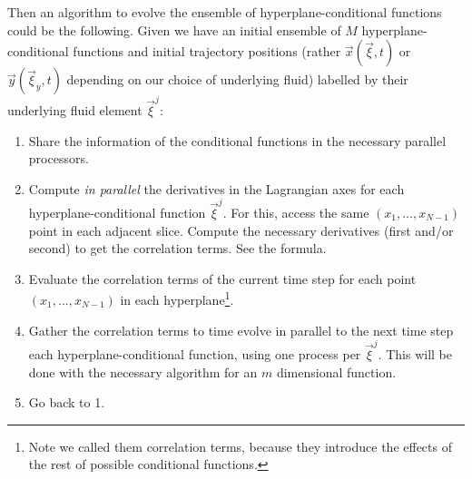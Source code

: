 \documentclass[11pt, a4paper]{article} %
\begin{document}
Then an algorithm to evolve the ensemble of hyperplane-conditional functions could be the following. Given we have an initial ensemble of $M$ hyperplane-conditional functions and initial trajectory positions (rather $\vec{x}(\vec{\xi},t)$ or $\vec{y}(\vec{\xi}_y,t)$ depending on our choice of underlying fluid) labelled by their underlying fluid element $\vec{\xi}^j$:
\begin{enumerate}
\item Share the information of the conditional functions in the necessary parallel processors.
\item Compute {\em in parallel} the derivatives in the Lagrangian axes for each hyperplane-conditional function $\vec{\xi}^j$. For this, access the same $(x_1,...,x_{N-1})$ point in each adjacent slice. Compute the necessary derivatives (first and/or second) to get the correlation terms. See the formula.
\item Evaluate the correlation terms of the current time step for each point $(x_1,...,x_{N-1})$ in each hyperplane\footnote{Note we called them correlation terms, because they introduce the effects of the rest of possible conditional functions.}.
\item Gather the correlation terms to time evolve in parallel to the next time step each hyperplane-conditional function, using one process per $\vec{\xi}^j$. This will be done with the necessary algorithm for an $m$ dimensional function.
\item Go back to 1.
\end{enumerate}
\end{document}
